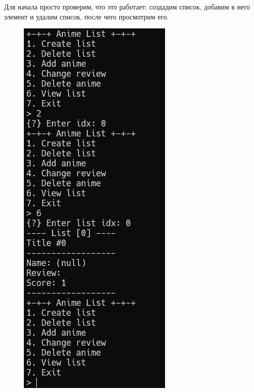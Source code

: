 \documentclass[idxtotoc,hyperref,openany,oneside]{files/pwn} %
\begin{document}
Для начала просто проверим, что это работает: создадим список, добавим в него элемент и удалим список, после чего просмотрим его.
\begin{figure}[H]
\begin{center}
\includegraphics[width=1.0\linewidth]{files/mal-get-libc}
\end{center}
\label{fig:mal-get-libc}
\end{figure}
\end{document}
